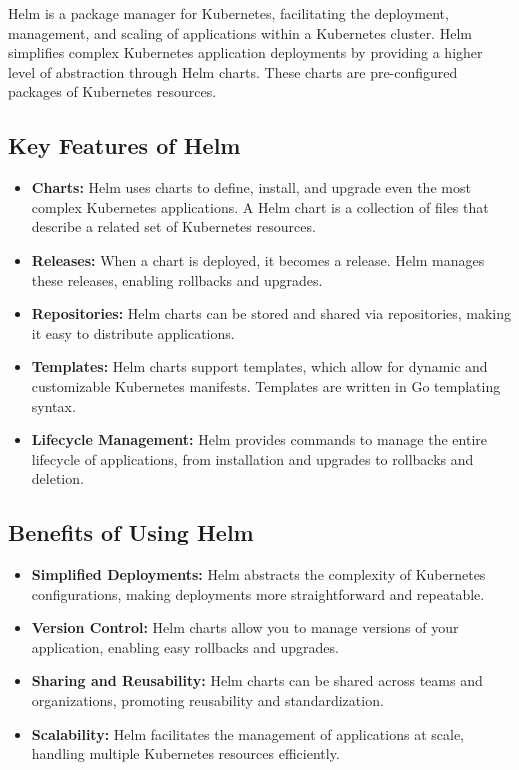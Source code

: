 Helm is a package manager for Kubernetes, facilitating the deployment, management, and scaling of applications within a Kubernetes cluster. Helm simplifies complex Kubernetes application deployments by providing a higher level of abstraction through Helm charts. These charts are pre-configured packages of Kubernetes resources.

\subsection{Key Features of Helm}
\begin{itemize}
    \item \textbf{Charts:} Helm uses charts to define, install, and upgrade even the most complex Kubernetes applications. A Helm chart is a collection of files that describe a related set of Kubernetes resources.
    \item \textbf{Releases:} When a chart is deployed, it becomes a release. Helm manages these releases, enabling rollbacks and upgrades.
    \item \textbf{Repositories:} Helm charts can be stored and shared via repositories, making it easy to distribute applications.
    \item \textbf{Templates:} Helm charts support templates, which allow for dynamic and customizable Kubernetes manifests. Templates are written in Go templating syntax.
    \item \textbf{Lifecycle Management:} Helm provides commands to manage the entire lifecycle of applications, from installation and upgrades to rollbacks and deletion.
\end{itemize}

\subsection{Benefits of Using Helm}
\begin{itemize}
    \item \textbf{Simplified Deployments:} Helm abstracts the complexity of Kubernetes configurations, making deployments more straightforward and repeatable.
    \item \textbf{Version Control:} Helm charts allow you to manage versions of your application, enabling easy rollbacks and upgrades.
    \item \textbf{Sharing and Reusability:} Helm charts can be shared across teams and organizations, promoting reusability and standardization.
    \item \textbf{Scalability:} Helm facilitates the management of applications at scale, handling multiple Kubernetes resources efficiently.
\end{itemize}

